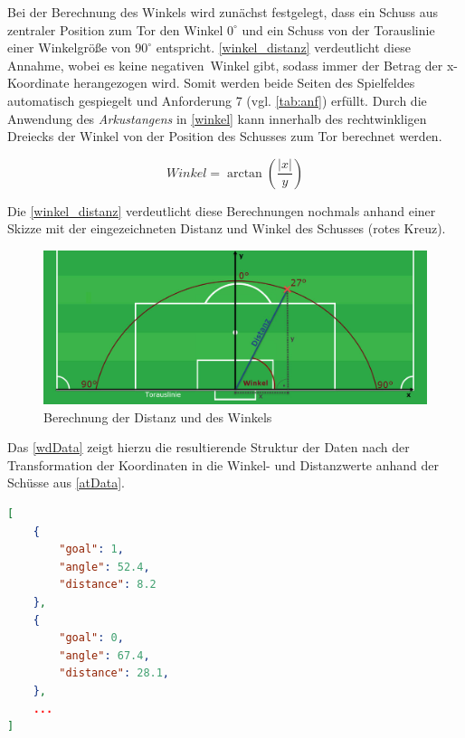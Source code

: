 Bei der Berechnung des Winkels wird zunächst festgelegt, dass ein Schuss aus zentraler Position zum Tor den Winkel $0^\circ$ und ein Schuss von der Torauslinie einer Winkelgröße von $90^\circ$ entspricht. \vref{winkel_distanz} verdeutlicht diese Annahme, wobei es keine \glqq negativen\grqq~Winkel gibt, sodass immer der Betrag der x-Koordinate herangezogen wird. Somit werden beide Seiten des Spielfeldes automatisch gespiegelt und Anforderung 7 (vgl. \vref{tab:anf}) erfüllt. Durch die Anwendung des \textit{Arkustangens} in \vref{winkel} kann innerhalb des rechtwinkligen Dreiecks der Winkel von der Position des Schusses zum Tor berechnet werden.

\begin{equation}
\label{winkel}
Winkel= \arctan(\frac{|x|}{y})
\end{equation}

Die \vref{winkel_distanz} verdeutlicht diese Berechnungen nochmals anhand einer Skizze mit der eingezeichneten Distanz und Winkel des Schusses	 (rotes Kreuz).

\begin{figure}[H]
\centering
\includegraphics[scale=0.45]{se-wa-jpg/winkel_distanz}
\caption[Berechnung der Distanz und des Winkels]{Berechnung der Distanz und des Winkels}
\label{winkel_distanz}
\end{figure}

Das \vref{wdData} zeigt hierzu die resultierende Struktur der Daten nach der Transformation der Koordinaten in die Winkel- und Distanzwerte anhand der Schüsse aus \vref{atData}.\newline

\begin{lstlisting}[caption=\captionListingText,language=json,xleftmargin=5mm,label=wdData] 
[
	{
		"goal": 1,
		"angle": 52.4,
		"distance": 8.2
	},
	{
		"goal": 0,
		"angle": 67.4,
		"distance": 28.1,
	},
	...
]
\end{lstlisting}

